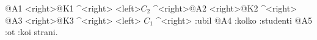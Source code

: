 \BEGIN\jtree\start
{\omit}@A1
<right>\stub{\omit}@K1  ^<right>{\omit}
<left>{$C_2$}  ^<right>\broken{\omit}@A2
<right>\stub{\omit}@K2  ^<right> {\omit}@A3
<right>\stub{\omit}@K3  ^<right>
<left> {$C_1$}  ^<right>\broken
:{ubil} {\omit}@A4
:{kolko} {\omit}
:{studenti} {\omit}@A5
:{ot} :{koi} {strani}.
\endjtree\END


